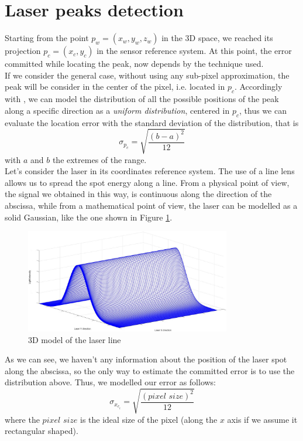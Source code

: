 \section{Laser peaks detection}
\label{sec:laser-peaks}

Starting from the point $ p_w = \left( x_w, y_w, z_w \right)$ in the 3D space, we reached its projection $p_c = \left( x_c, y_c \right)$ in the sensor reference system. At this point, the error committed while locating the peak, now depends by the technique used. \\

If we consider the general case, without using any sub-pixel approximation, the peak will be consider in the center of the pixel, i.e. located in $p_c$. Accordingly with \cite{th:quattrini}, we can model the distribution of all the possible positions of the peak along a specific direction as a \textit{uniform distribution}, centered in $p_c$, thus we can evaluate the location error with the standard deviation of the distribution, that is
  \begin{equation*}
    \sigma_{p_c} = \sqrt{\frac{\left(b - a\right)^2}{12}}
  \end{equation*}
with $a$ and $b$ the extremes of the range. \\
Let's consider the laser in its coordinates reference system. The use of a line lens allows us to spread the spot energy along a line. From a physical point of view, the signal we obtained in this way, is continuous along the direction of the abscissa, while from a mathematical point of view, the laser can be modelled as a solid Gaussian, like the one shown in Figure \ref{fig:mod-laser-line}.
  \begin{figure}[t!]
    \centering
    \includegraphics[width=0.8\textwidth]{./images/model/3Dgauss_grid.jpg}
    \caption{3D model of the laser line}
    \label{fig:mod-laser-line}
  \end{figure}
As we can see, we haven't any information about the position of the laser spot along the abscissa, so the only way to estimate the committed error is to use the distribution above. Thus, we modelled our error as follows:
  \begin{equation*}
    \sigma_{x_{c_i}} = \sqrt{\frac{\left(pixel \,\, size \right)^2}{12}}
  \end{equation*}
where the $pixel \,\, size$ is the ideal size of the pixel (along the $x$ axis if we assume it rectangular shaped). \\

